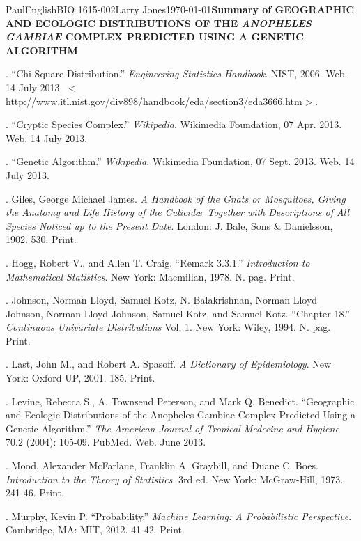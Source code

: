 \documentclass[10pt,twocolumn]{article}
\begin{document}
\begin{mla}{Paul}{English}{BIO 1615-002}{Larry Jones}{\today}{\textbf{Summary of GEOGRAPHIC AND ECOLOGIC DISTRIBUTIONS OF THE \textit{ANOPHELES GAMBIAE} COMPLEX PREDICTED USING A GENETIC ALGORITHM}}
\begin{workscited}
. ``Chi-Square Distribution.'' \textit{Engineering Statistics Handbook}. NIST, 2006. Web. 14 July 2013. $<$http://www.itl.nist.gov/div898/handbook/eda/section3/eda3666.htm$>$.

. ``Cryptic Species Complex.'' \textit{Wikipedia}. Wikimedia Foundation, 07 Apr. 2013. Web. 14 July 2013.

. ``Genetic Algorithm.'' \textit{Wikipedia}. Wikimedia Foundation, 07 Sept. 2013. Web. 14 July 2013.

. Giles, George Michael James. \textit{A Handbook of the Gnats or Mosquitoes, Giving the Anatomy and Life History of the Culicid\ae\, Together with Descriptions of All Species Noticed up to the Present Date}. London: J. Bale, Sons \& Danielsson, 1902. 530. Print.

. Hogg, Robert V., and Allen T. Craig. ``Remark 3.3.1.'' \textit{Introduction to Mathematical Statistics}. New York: Macmillan, 1978. N. pag. Print.

. Johnson, Norman Lloyd, Samuel Kotz, N. Balakrishnan, Norman Lloyd Johnson, Norman Lloyd Johnson, Samuel Kotz, and Samuel Kotz. ``Chapter 18.'' \textit{Continuous Univariate Distributions} Vol. 1. New York: Wiley, 1994. N. pag. Print.

. Last, John M., and Robert A. Spasoff. \textit{A Dictionary of Epidemiology}. New York: Oxford UP, 2001. 185. Print.

. Levine, Rebecca S., A. Townsend Peterson, and Mark Q. Benedict. ``Geographic and Ecologic Distributions of the Anopheles Gambiae Complex Predicted Using a Genetic Algorithm.'' \textit{The American Journal of Tropical Medecine and Hygiene} 70.2 (2004): 105-09. PubMed. Web. June 2013.

. Mood, Alexander McFarlane, Franklin A. Graybill, and Duane C. Boes. \textit{Introduction to the Theory of Statistics}. 3rd ed. New York: McGraw-Hill, 1973. 241-46. Print.

. Murphy, Kevin P. ``Probability.'' \textit{Machine Learning: A Probabilistic Perspective}. Cambridge, MA: MIT, 2012. 41-42. Print.

\end{workscited}

\end{mla}
\end{document}

